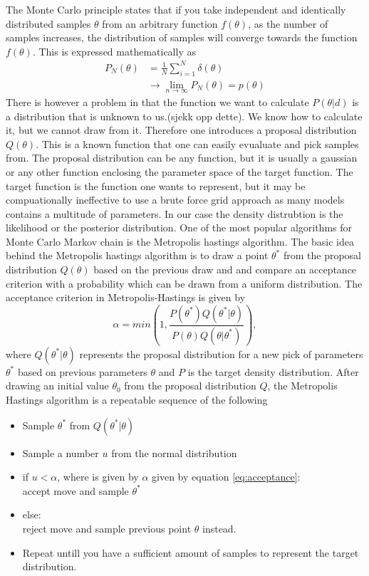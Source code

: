The Monte Carlo principle states that if you take
independent and identically distributed samples $\theta$ from an arbitrary
function $f(\theta)$, as the number of samples increases, the distribution of
samples will converge towards the function $f(\theta)$. This is expressed
mathematically as
\begin{align}
    P_N(\theta) &= \frac{1}{N}\sum_{i=1}^N\delta(\theta)\\
    &\rightarrow \lim_{n\to\infty}P_N(\theta)=p(\theta)
\end{align}
There is however a problem in that the function we want to calculate
$P(\theta\vert d)$ is a distribution that is unknown to us.(sjekk opp dette). We
know how to calculate it, but we cannot draw from it. Therefore one introduces a
proposal distribution $Q(\theta)$. This is a known function that one can easily
evualuate and pick samples from. The proposal distribution can be any function,
but it is usually a gaussian or any other function enclosing the parameter space
of the target function. The target function is the function one wants to
represent, but it may be compuationally ineffective to use a brute force grid
approach as many models contains a multitude of parameters. In our case the
density distrubtion is the likelihood or the posterior distribution. One of the
most popular algorithms for Monte Carlo Markov chain is the Metropolis hastings
algorithm. The basic idea behind the Metropolis hastings algorithm is to draw a
point $\theta^*$ from the proposal distribution $Q(\theta)$ based on the
previous draw and and compare an acceptance criterion with a probability which
can be drawn from a uniform distribution. The acceptance criterion in
Metropolis-Hastings is given by
\begin{equation}\label{eq:acceptance}
    \alpha = min(1, \frac{P(\theta^*)Q(\theta^*\vert \theta)}{P(\theta)Q(\theta\vert\theta^*)}),
\end{equation}
where $Q(\theta^*\vert\theta)$ represents the proposal distribution for a new
pick of parameters $\theta^*$ based on previous parameters $\theta$ and $P$ is
the target density distribution. After
drawing an initial value $\theta_0$ from the proposal distribution $Q$, the
Metropolis Hastings algorithm is a repeatable sequence of the following
\begin{itemize}
    \item Sample $\theta^*$ from $Q(\theta^*\vert\theta)$ \\
    \item Sample a number $u$ from the normal distribution \\
    \item if $u < \alpha$, where is given by $\alpha$ given by equation \ref{eq:acceptance}: \\
          \indent accept move and sample $\theta^*$\\
    \item else:\\
          \indent reject move and sample previous point $\theta$ instead.\\
    \item Repeat untill you have a sufficient amount of samples to represent the
    target distribution.
\end{itemize}
